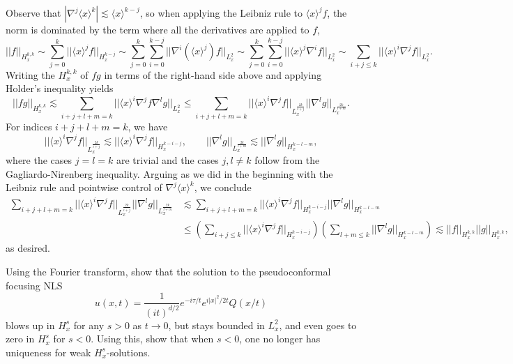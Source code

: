 \begin{solution}
	Observe that $|\nabla^j \langle x \rangle^k | \lesssim \langle x \rangle^{k - j}$, so when applying the Leibniz rule to $\langle x \rangle^j f$, the norm is dominated by the term where all the derivatives are applied to $f$,
		\[ || f||_{H^{k, k}_x} \sim\sum_{j = 0}^k || \langle x \rangle^j f ||_{H^{k - j}_x} \sim \sum_{j = 0}^k \sum_{i = 0}^{k - j} || \nabla^i (\langle x \rangle^j) f ||_{L^2_x} \sim \sum_{j = 0}^k \sum_{i = 0}^{k - j} || \langle x \rangle^j \nabla^i f ||_{L^2_x} \sim \sum_{i + j \leq k} || \langle x \rangle^i \nabla^j f ||_{L^2_x}. \]
	Writing the $H^{k, k}_x$ of $fg$ in terms of the right-hand side above and applying Holder's inequality yields
		\[ ||f g ||_{H^{k, k}_x} \lesssim \sum_{i + j + l + m = k} || \langle x \rangle^i \nabla^j f \nabla^l g ||_{L^2_x} \leq \sum_{i + j + l + m = k} || \langle x \rangle^i \nabla^j f ||_{L^{\frac{2k}{i + j}}_x} || \nabla^l g||_{L^{\frac{2k}{l  + m}}_x} . \]
	For indices $i + j + l + m = k$, we have
		\[  || \langle x \rangle^i \nabla^j f ||_{L^{\frac{2k}{i + j}}_x} \lesssim ||  \langle x \rangle^i \nabla^j f ||_{H^{k - i - j}_x}, \qquad || \nabla^l g||_{L^{\frac{2k}{l  + m}}_x} \lesssim || \nabla^l g ||_{H^{k - l - m}_x},\]
	where the cases $j = l = k$ are trivial and the cases $j, l \neq k$ follow from the Gagliardo-Nirenberg inequality. Arguing as we did in the beginning with the Leibniz rule and pointwise control of $\nabla^j \langle x \rangle^k$, we conclude
		\begin{align*}
			\sum_{i + j + l + m = k} || \langle x \rangle^i \nabla^j f ||_{L^{\frac{2k}{i + j}}_x} || \nabla^l g||_{L^{\frac{2k}{l  + m}}_x} 
				&\lesssim \sum_{i + j + l + m = k} || \langle x \rangle^i \nabla^j f ||_{H^{k - i - j}_x} || \nabla^l g||_{H^{k - l - m}_x} \\
				&\leq \left( \sum_{i + j \leq k}  || \langle x \rangle^i \nabla^j f ||_{H^{k - i - j}_x}  \right) \left( \sum_{l + m \leq k} || \nabla^l g||_{H^{k - l - m}_x} \right) \lesssim ||f||_{H^{k, k}_x} ||g||_{H^{k, k}_x},
		\end{align*}	
	as desired. 	
\end{solution}

\begin{statement}
	Using the Fourier transform, show that the solution to the pseudoconformal focusing NLS
		\[ u(x, t) = \frac{1}{(it)^{d/2}} e^{-i \tau/t} e^{i |x|^2/2t} Q(x/t) \]
	blows up in $H^s_x$ for any $s > 0$ as $t \to 0$, but stays bounded in $L^2_x$, and even goes to zero in $H^s_x$ for $s < 0$. Using this, show that when $s < 0$, one no longer has uniqueness for weak $H^s_x$-solutions. 
\end{statement}

